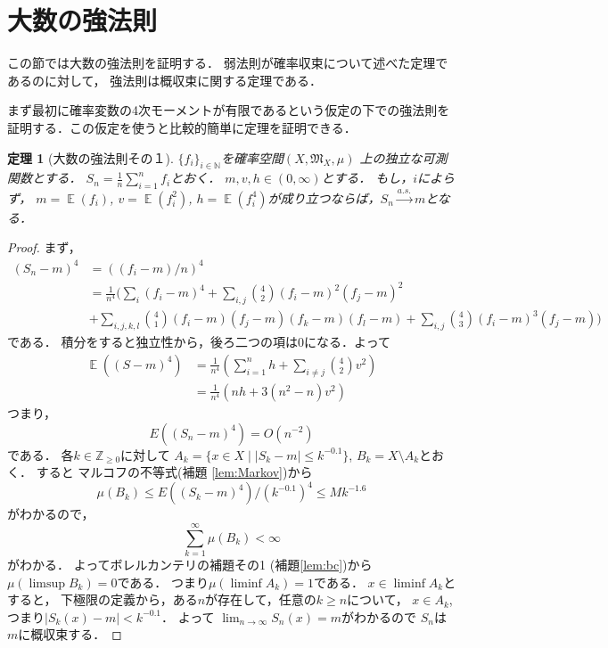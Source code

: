 \documentclass[leqno, a4paper, 12pt]{jsarticle}
\newtheorem{thm}{定理}
\newcommand{\nn}{\mathbb{N}}
\newcommand{\zz}{\mathbb{Z}}
\DeclareMathOperator{\mean}{\mathbb{E}}
\begin{document}
\section{大数の強法則}
この節では大数の強法則を証明する．
弱法則が確率収束について述べた定理であるのに対して，
強法則は概収束に関する定理である．

まず最初に確率変数の4次モーメントが有限であるという仮定の下での強法則を証明する．この仮定を使うと比較的簡単に定理を証明できる．
\begin{thm}[大数の強法則その１]\label{thm:strlaw1}
$\{f_i\}_{i\in \nn}$を確率空間$(X, \mathfrak{M}_X, \mu)$
上の独立な可測関数とする．
$S_n=\frac{1}{n}\sum_{i=1}^nf_{i}$とおく．
$m, v, h\in (0, \infty)$とする．
もし，$i$によらず，
$m=\mean(f_{i})$, 
$v=\mean(f_{i}^{2})$, 
$h=\mean(f_{i}^{4})$が成り立つならば，$S_n\xrightarrow{a. s. }m$となる．
\end{thm}
\begin{proof}
まず，
\begin{align*}
(S_n-m)^4&=((f_i-m)/n)^4\\
&=
\frac{1}{n^4}\Biggl(
\sum_{i}(f_i-m)^4+\sum_{i, j}\binom{4}{2}(f_i-m)^2(f_j-m)^2\\
&+\sum_{i, j, k, l}\binom{4}{1}(f_i-m)(f_j-m)(f_k-m)(f_l-m)+
\sum_{i, j}\binom{4}{3}(f_i-m)^3(f_j-m)
\Biggr)
\end{align*}
である．
積分をすると独立性から，後ろ二つの項は$0$になる．よって
\begin{align*}
\mean((S-m)^4)&=
\frac{1}{n^4}\left(\sum_{i=1}^nh+\sum_{i\neq j}\binom{4}{2}v^2\right)\\
&=\frac{1}{n^4}\left(nh+3(n^2-n)v^2\right)
\end{align*}
つまり，
\[
E((S_n-m)^4)=O(n^{-2})
\]
である．
各$k\in \zz_{\ge 0}$に対して
$A_k=\{x\in X\mid |S_k-m|\le k^{-0.1}\}$, 
 $B_k=X\setminus A_k$とおく．
すると
マルコフの不等式(補題 \ref{lem:Markov})から
\[
\mu(B_k)\le E((S_k-m)^4)/(k^{-0.1})^4\le 
Mk^{-1.6}
\]
がわかるので，
\[
\sum_{k=1}^{\infty}\mu(B_k)<\infty
\]
がわかる．
よってボレルカンテリの補題その1 (補題\ref{lem:bc})から
$\mu(\limsup B_k)=0$である．
つまり$\mu(\liminf A_k)=1$である．
$x\in \liminf A_k$とすると，
下極限の定義から，ある$n$が存在して，任意の$k\ge n$について，
$x\in A_k$, 
つまり$|S_k(x)-m|<k^{-0.1}$．
よって
$\lim_{n\to \infty}S_n(x)=m$がわかるので
$S_n$は$m$に概収束する．
\end{proof}
\end{document}
